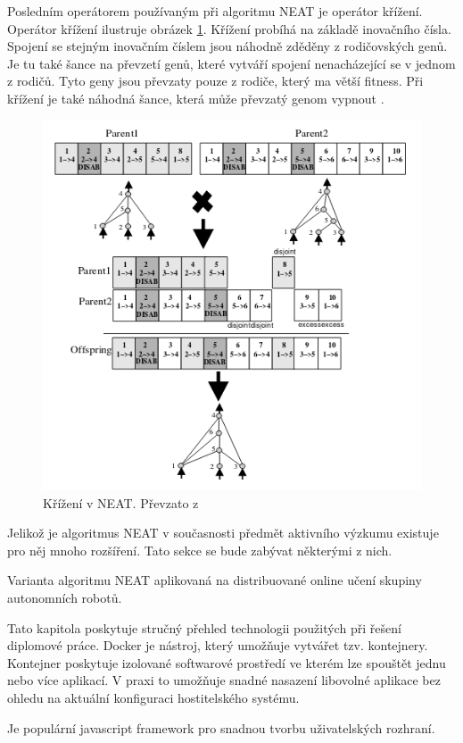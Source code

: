Posledním operátorem používaným při algoritmu NEAT je operátor křížení. Operátor křížení ilustruje obrázek \ref{fig:neatcrossover}. Křížení probíhá na základě inovačního čísla. Spojení se stejným inovačním číslem jsou náhodně zděděny z rodičovských genů. Je tu také šance na převzetí genů, které vytváří spojení nenacházející se v jednom z rodičů. Tyto geny jsou převzaty pouze z rodiče, který ma větší fitness. Při křížení je také náhodná šance, která může převzatý genom vypnout \cite[s.~12]{NEAT}.

\begin{figure}[h!]
	\centering
	\includegraphics[width=0.6\linewidth]{neatCrossover}
	\caption{Křížení v NEAT. Převzato z \cite[s.~12]{NEAT}}
	\label{fig:neatcrossover}
\end{figure}

Jelikož je algoritmus NEAT v současnosti předmět aktivního výzkumu existuje pro něj mnoho rozšíření. Tato sekce se bude zabývat některými z nich.

Varianta algoritmu NEAT aplikovaná na distribuované online učení skupiny autonomních robotů.

Tato kapitola poskytuje stručný přehled technologii použitých při řešení diplomové práce.
Docker je nástroj, který umožňuje vytvářet tzv. kontejnery. Kontejner poskytuje izolované softwarové prostředí ve kterém lze spouštět jednu nebo více aplikací. 
V praxi to umožňuje snadné nasazení libovolné aplikace bez ohledu na aktuální konfiguraci hostitelského systému.

Je populární javascript framework pro snadnou tvorbu uživatelských rozhraní.

